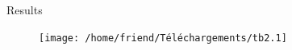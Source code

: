 \documentclass[ignorenonframetext,]{beamer}
\begin{document}
\begin{frame}

\begin{block}{Results}

\begin{figure}
\texttt{[image: /home/friend/Téléchargements/tb2.1]} \caption{ }\label{fig:image-ref-for-in-text}
\end{figure}

\end{block}

\end{frame}
\end{document}
